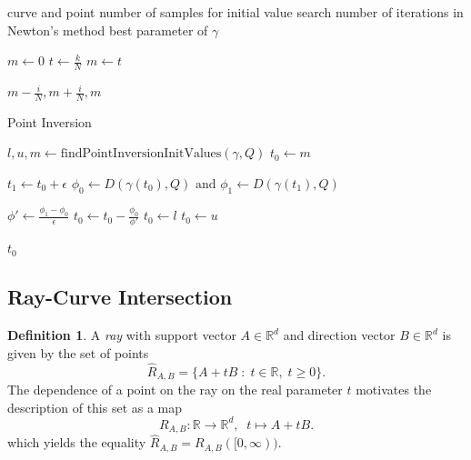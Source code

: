 \documentclass[a4paper, 11pt]{report}
\theoremstyle{definition}
\newtheorem{definition}{Definition}[section]
\renewcommand{\emph}[1]{\textit{#1}}
\newcommand{\Desc}[2]{\State \makebox[12em][l]{#1}#2}
\begin{document}
	\begin{algorithm}[H]
		\begin{algorithmic}[1]
			\Input
				\Desc{$\gamma, Q$}{curve and point}
				\Desc{$N$}{number of samples for initial value search}
				\Desc{$M$}{number of iterations in Newton's method}
			\EndInput
			\Output
				\Desc{$t^*$}{best parameter of $\gamma$}
			\EndOutput
			
				\State $m \gets 0$
					\State $t \gets \frac{k}{N}$
						$m \gets t$
					\EndIf
				\EndFor

				\Return $m-\frac{i}{N}, m+\frac{i}{N}, m$
			\EndProcedure

			\caption{Point Inversion}\label{alg:pointinversion}
				\State $l, u, m \gets \text{findPointInversionInitValues}(\gamma, Q)$
				\State $t_0 \gets m$

					\State $t_1 \gets t_0 + \epsilon$
					\State $\phi_0 \gets D(\gamma(t_0), Q) \text{ and } \phi_1 \gets D(\gamma(t_1), Q)$
					
					\State $\phi' \gets \frac{\phi_1 - \phi_0}{\epsilon}$
					\State $t_0 \gets t_0 - \frac{\phi_0}{\phi'}$
					 $t_0 \gets l$ \EndIf
					 $t_0 \gets u$ \EndIf

				\EndFor

				\Return $t_0$
			\EndProcedure
		\end{algorithmic}
	\end{algorithm}

\subsection{Ray-Curve Intersection}
	\begin{definition}
		A \emph{ray} with support vector $A \in \mathbb{R}^d$ and direction vector $B \in \mathbb{R}^d$ is given by the set of points
			\begin{equation*}
				\hat R_{A,B} = \{A + tB \;:\; t \in \mathbb{R},\; t \geq 0\}.
			\end{equation*}
		The dependence of a point on the ray on the real parameter $t$ motivates the description of this set as a map
			$$R_{A,B}: \mathbb{R} \rightarrow \mathbb{R}^d,\;\; t \mapsto A+tB.$$
		which yields the equality $\hat R_{A,B} = R_{A,B}([0,\infty))$.
	\end{definition}
\end{document}
